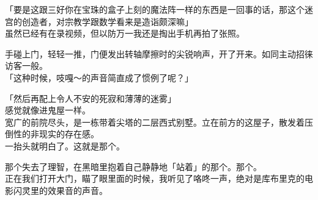 「要是这跟三好你在宝珠的盒子上刻的魔法阵一样的东西是一回事的话，那这个迷宫的创造者，对宗教学跟数学看来是造诣颇深嘛」\\

虽然已经有在录视频，但以防万一我还是掏出手机再拍了张照。

手碰上门，轻轻一推，门便发出转轴摩擦时的尖锐响声，开了开来。如同主动招徕访客一般。\\

「这种时候，吱嘎～的声音简直成了惯例了呢？」

「然后再配上令人不安的死寂和薄薄的迷雾」\\

感觉就像进鬼屋一样。\\

宽广的前院尽头，是一栋带着尖塔的二层西式别墅。立在前方的这屋子，散发着压倒性的非现实的存在感。\\

一抬头就明白了。这就是那个。

那个失去了理智，在黑暗里抱着自己静静地「站着」的那个。那个。\\

正在我们打开大门，瞄了眼里面的时候，我听见了咯咚一声，绝对是库布里克的电影闪灵里的效果音的声音。\\

